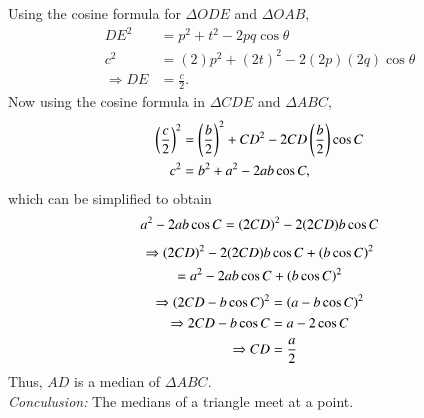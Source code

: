 \proof Using the cosine formula for $\Delta ODE$ and $\Delta OAB$, 
\begin{align}
DE^2 &= p^2 + t^2 -2pq\cos \theta \\
c^2 & = (2)p^2 + (2t)^2 -2(2p)(2q)\cos \theta \\
\Rightarrow DE &= \frac{c}{2}.
\end{align}
%
Now using the cosine formula in $\Delta CDE$ and $\Delta ABC$, 
\begin{align}
\left(\frac{c}{2}\right)^2 &= \left(\frac{b}{2}\right)^2 +CD^2 -2CD \left(\frac{b}{2}\right) \cos C\\
c^2 &= b^2 + a^2 -2 a b \cos C,
\end{align}
which can be simplified to obtain
%
\begin{align}
a^2 - 2ab \cos C = \left(2CD\right)^2 - 2(2CD)b  \cos C 
\end{align}
\begin{multline}
\Rightarrow  \left(2CD\right)^2 - 2(2CD)b  \cos C  + \left(b \cos C \right)^2 
\\
= a^2 - 2ab \cos C + \left(b \cos C \right)^2 
\end{multline}
\begin{align}
\Rightarrow \left(2CD - b\cos C\right)^2 &= \left(a - b\cos C\right)^2 \\
\Rightarrow 2CD - b\cos C &= a - 2\cos C \\
\Rightarrow CD &= \frac{a}{2}
\end{align}
%
Thus, $AD$ is a median of $\Delta ABC$.  
\\
%
{\em Conculusion:} The medians of a triangle meet at a point.